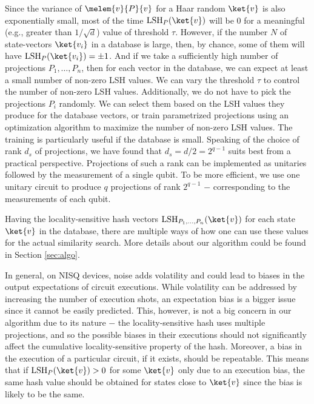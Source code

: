 \documentclass[pra,twocolumn,superscriptaddress,longbibliography]{revtex4-2}
\theoremstyle{remark}
\DeclareMathOperator{\lsh}{LSH}
\numberwithin{equation}{section}
\begin{document}
Since the variance of $\melem{v}{P}{v}$ for a Haar random $\ket{v}$ is also exponentially small, 
most of the time $\lsh_P(\ket{v})$ will be $0$ for a meaningful (e.g., greater than $1/\sqrt{d}$) value of threshold $\tau$. 
However, if the number $N$ of state-vectors $\ket{v_i}$ in a database is large, then, by chance, 
some of them will have $\lsh_P(\ket{v_i})=\pm 1$. And if we take a sufficiently high number of projections $P_1, \dots, P_n$, 
then for each vector in the database, we can expect at least a small number of non-zero LSH values. 
We can vary the threshold $\tau$ to control the number of non-zero LSH values. 
Additionally, we do not have to pick the projections $P_i$ randomly. 
We can select them based on the LSH values they produce for the database vectors, 
or train parametrized projections using an optimization algorithm to maximize the number of non-zero LSH values. 
The training is particularly useful if the database is small. %
Speaking of the choice of rank $d_s$ of projections, we have found that $d_s = d/2 = 2^{q-1}$ suits best from a practical perspective. 
Projections of such a rank can be implemented as unitaries followed by the measurement of a single qubit. 
To be more efficient, we use one unitary circuit to produce $q$ projections of rank $2^{q-1}$ $-$ corresponding to the measurements of each qubit. 

Having the locality-sensitive hash vectors $\lsh_{P_1, \dots, P_n}(\ket{v})$ 
for each state $\ket{v}$ in the database, 
there are multiple ways of how one can use these values for the actual similarity search. 
More details about our algorithm could be found in Section \ref{sec:algo}.  

In general, on NISQ devices, noise adds volatility and could lead to biases in the output expectations of circuit executions. 
While volatility can be addressed by increasing the number of execution shots, an expectation bias is a bigger issue since it cannot be easily predicted. 
This, however, is not a big concern in our algorithm due to its nature $-$ the locality-sensitive hash uses multiple projections, 
and so the possible biases in their executions should not significantly affect the cumulative locality-sensitive property of the hash. 
Moreover, a bias in the execution of a particular circuit, if it exists, should be repeatable. 
This means that if $\lsh_P(\ket{v}) > 0$ for some $\ket{v}$ only due to an execution bias, 
the same hash value should be obtained for states close to $\ket{v}$ since the bias is likely to be the same. 
\end{document}
